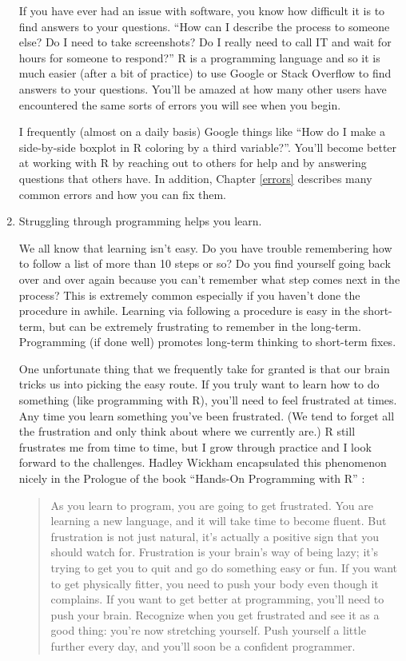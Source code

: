 \documentclass[]{tufte-book}
\begin{document}
\begin{enumerate}
  If you have ever had an issue with software, you know how difficult it
  is to find answers to your questions. ``How can I describe the process
  to someone else? Do I need to take screenshots? Do I really need to
  call IT and wait for hours for someone to respond?'' R is a
  programming language and so it is much easier (after a bit of
  practice) to use Google or Stack Overflow to find answers to your
  questions. You'll be amazed at how many other users have encountered
  the same sorts of errors you will see when you begin.

  I frequently (almost on a daily basis) Google things like ``How do I
  make a side-by-side boxplot in R coloring by a third variable?''.
  You'll become better at working with R by reaching out to others for
  help and by answering questions that others have. In addition, Chapter
  \ref{errors} describes many common errors and how you can fix them.
\item
  Struggling through programming helps you learn.

  We all know that learning isn't easy. Do you have trouble remembering
  how to follow a list of more than 10 steps or so? Do you find yourself
  going back over and over again because you can't remember what step
  comes next in the process? This is extremely common especially if you
  haven't done the procedure in awhile. Learning via following a
  procedure is easy in the short-term, but can be extremely frustrating
  to remember in the long-term. Programming (if done well) promotes
  long-term thinking to short-term fixes.

  One unfortunate thing that we frequently take for granted is that our
  brain tricks us into picking the easy route. If you truly want to
  learn how to do something (like programming with R), you'll need to
  feel frustrated at times. Any time you learn something you've been
  frustrated. (We tend to forget all the frustration and only think
  about where we currently are.) R still frustrates me from time to
  time, but I grow through practice and I look forward to the
  challenges. Hadley Wickham encapsulated this phenomenon nicely in the
  Prologue of the book ``Hands-On Programming with R''
  \citep{handson2014}:

  \begin{quote}
  As you learn to program, you are going to get frustrated. You are
  learning a new language, and it will take time to become fluent. But
  frustration is not just natural, it's actually a positive sign that
  you should watch for. Frustration is your brain's way of being lazy;
  it's trying to get you to quit and go do something easy or fun. If you
  want to get physically fitter, you need to push your body even though
  it complains. If you want to get better at programming, you'll need to
  push your brain. Recognize when you get frustrated and see it as a
  good thing: you're now stretching yourself. Push yourself a little
  further every day, and you'll soon be a confident programmer.
  \end{quote}
\end{enumerate}
\end{document}
